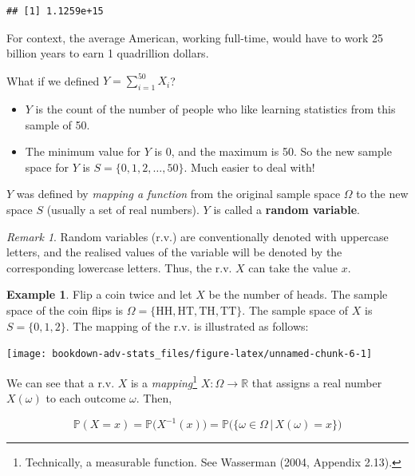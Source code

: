 \documentclass[
]{book}
\providecommand{\tightlist}{%
  \setlength{\itemsep}{0pt}\setlength{\parskip}{0pt}}
\newcommand{\bbR}{\mathbb{R}}
\newcommand{\bbP}{\mathbb{P}}
\theoremstyle{definition}
\theoremstyle{definition}
\newtheorem{example}{Example}[chapter]
\theoremstyle{definition}
\theoremstyle{definition}
\theoremstyle{remark}
\newtheorem*{remark}{Remark}
\begin{document}
\begin{verbatim}
## [1] 1.1259e+15
\end{verbatim}

For context, the average American, working full-time, would have to work 25 billion years to earn 1 quadrillion dollars.

What if we defined \(Y = \sum_{i=1}^{50} X_i\)?

\begin{itemize}
\tightlist
\item
  \(Y\) is the count of the number of people who like learning statistics from this sample of 50.
\item
  The minimum value for \(Y\) is 0, and the maximum is 50. So the new sample space for \(Y\) is \(S = \{0,1,2,\dots,50\}\). Much easier to deal with!
\end{itemize}

\(Y\) was defined by \emph{mapping a function} from the original sample space \(\Omega\) to the new space \(S\) (usually a set of real numbers).
\(Y\) is called a \textbf{random variable}.

\begin{remark}
Random variables (r.v.) are conventionally denoted with uppercase letters, and the realised values of the variable will be denoted by the corresponding lowercase letters. Thus, the r.v. \(X\) can take the value \(x\).
\end{remark}

\begin{example}

Flip a coin twice and let \(X\) be the number of heads.
The sample space of the coin flips is \(\Omega = \{\text{HH}, \text{HT}, \text{TH}, \text{TT} \}\).
The sample space of \(X\) is \(S = \{0,1,2 \}\).
The mapping of the r.v. is illustrated as follows:

\begin{center}\texttt{[image: bookdown-adv-stats\_files/figure-latex/unnamed-chunk-6-1]} \end{center}

\end{example}

We can see that a r.v. \(X\) is a \emph{mapping}\footnote{Technically, a measurable function. See Wasserman (2004, Appendix 2.13).} \(X:\Omega \to \bbR\) that assigns a real number \(X(\omega)\) to each outcome \(\omega\). Then,

\[
  \bbP(X=x) = \bbP\big(X^{-1}(x)\big) = \bbP\big(\{ \omega \in \Omega \,|\, X(\omega) = x\} \big)
\]
\end{document}
